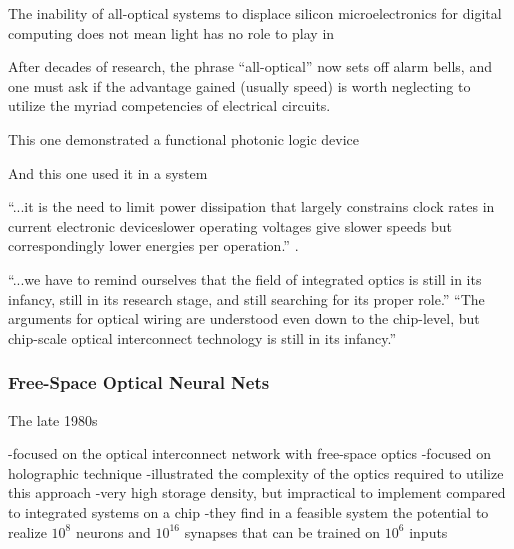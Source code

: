 The inability of all-optical systems to displace silicon microelectronics for digital computing does not mean light has no role to play in 

\vspace{3em}
After decades of research, the phrase ``all-optical'' now sets off alarm bells, and one must ask if the advantage gained (usually speed) is worth neglecting to utilize the myriad competencies of electrical circuits.

\vspace{3em}
This one demonstrated a functional photonic logic device
\cite{lehi1989}

And this one used it in a system
\cite{mccl1993}


\vspace{3em}
``...it is the need to limit power dissipation that largely constrains clock rates in current electronic devices\textemdash lower operating voltages give slower speeds but correspondingly lower energies per operation.'' \cite{mi2010}.

\vspace{3em}
``...we have to remind ourselves that the field of integrated optics is still in its infancy, still in its research stage, and still searching for its proper role.'' \cite{ko1981}
``The arguments for optical wiring are understood even down to the chip-level, but chip-scale optical interconnect technology is still in its infancy.'' \cite{mi2010}

\subsubsection{Free-Space Optical Neural Nets}
The late 1980s 


\cite{jast1986}
-focused on the optical interconnect network with free-space optics
-focused on holographic technique
-illustrated the complexity of the optics required to utilize this approach 
-very high storage density, but impractical to implement compared to integrated systems on a chip
-they find in a feasible system the potential to realize $10^8$ neurons and $10^{16}$ synapses that can be trained on $10^6$ inputs


